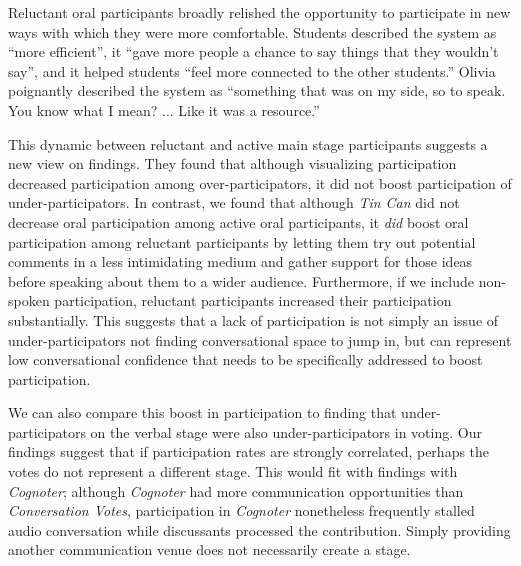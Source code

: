 Reluctant oral participants broadly relished the opportunity to participate in new ways with which they were more comfortable. Students described the system as ``more efficient'', it ``gave more people a chance to say things that they wouldn't say'', and it helped students ``feel more connected to the other students.'' Olivia poignantly described the system as ``something that was on my side, so to speak. You know what I mean? ... Like it was a resource.'' 


This dynamic between reluctant and active main stage participants suggests a new view on  findings. They found that although visualizing participation decreased participation among over-participators, it did not boost participation of under-participators. In contrast, we found that although \emph{Tin Can} did not decrease oral participation among active oral participants, it \emph{did} boost oral participation among reluctant participants by letting them try out potential comments in a less intimidating medium and gather support for those ideas before speaking about them to a wider audience. Furthermore, if we include non-spoken participation, reluctant participants increased their participation substantially. This suggests that a lack of participation is not simply an issue of under-participators not finding conversational space to jump in, but can represent low conversational confidence that needs to be specifically addressed to boost participation.



We can also compare this boost in participation to  finding that under-participators on the verbal stage were also under-participators in voting. Our findings suggest that if participation rates are strongly correlated, perhaps the votes do not represent a different stage. This would fit with  findings with \emph{Cognoter}; although \emph{Cognoter} had more communication opportunities than \emph{Conversation Votes}, participation in \emph{Cognoter} nonetheless frequently stalled audio conversation while discussants processed the contribution. Simply providing another communication venue does not necessarily create a stage. 

